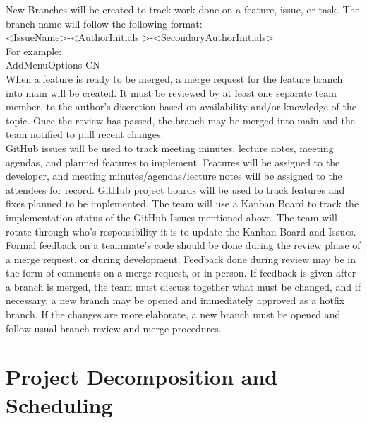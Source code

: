 \documentclass{article}
\begin{document}
New Branches will be created to track work done on a feature, issue, or task. The branch name will follow the following format: \\ 

\textless Issue\textunderscore Name\textgreater-\textless AuthorInitials \textgreater-\textless SecondaryAuthorInitials\textgreater \\

For example:  \\

Add\textunderscore Menu\textunderscore Options-CN \\

When a feature is ready to be merged, a merge request for the feature branch into main will be created. It must be reviewed by at least one separate team member, to the author’s discretion based on availability and/or knowledge of the topic. Once the review has passed, the branch may be merged into main and the team notified to pull recent changes.  \\

GitHub issues will be used to track meeting minutes, lecture notes, meeting agendas, and planned features to implement. Features will be assigned to the developer, and meeting minutes/agendas/lecture notes will be assigned to the attendees for record. GitHub project boards will be used to track features and fixes planned to be implemented. The team will use a Kanban Board to track the implementation status of the GitHub Issues mentioned above.  The team will rotate through who’s responsibility it is to update the Kanban Board and Issues.  \\

Formal feedback on a teammate’s code should be done during the review phase of a merge request, or during development. Feedback done during review may be in the form of comments on a merge request, or in person. If feedback is given after a branch is merged, the team must discuss together what must be changed, and if necessary, a new branch may be opened and immediately approved as a hotfix branch. If the changes are more elaborate, a new branch must be opened and follow usual branch review and merge procedures.  \\

\section{Project Decomposition and Scheduling}
\end{document}
